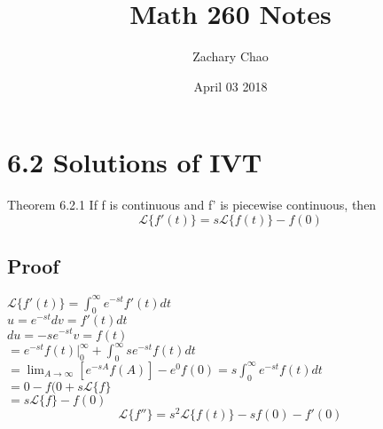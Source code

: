 \documentclass[12pt, letterpaper, twoside]{article}
\title{Math 260 Notes}
\author{Zachary Chao}
\date{April 03 2018}
\newcommand{\laplace}{\mathcal{L}}
\begin{document}
\section*{6.2 Solutions of IVT}
Theorem 6.2.1 If f is continuous and f' is piecewise continuous, then
$$\laplace\{f'(t)\}=s \laplace\{f(t)\}-f(0)$$

\subsection*{Proof}
$\laplace\{f'(t)\}=\int_0^\infty e^{-st}f'(t)dt$\\
$u=e^{-st}    dv=f'(t)dt$\\
$du=-se^{-st}    v=f(t)$\\
$=e^{-st}f(t)|_0^\infty+\int_0^\infty se^{-st}f(t)dt$\\
$=\lim_{A\to\infty}[e^{-sA}f(A)]-e^0f(0)=s\int_0^\infty e^{-st}f(t)dt$\\
$=0-f(0+s\laplace\{f\}$\\
$=s\laplace\{f\}-f(0)$\\
$$\laplace\{f''\}=s^2\laplace\{f(t)\}-sf(0)-f'(0)$$
\end{document}

